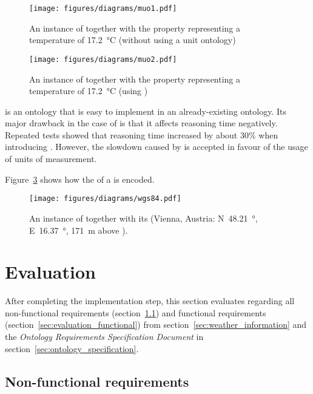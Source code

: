 \begin{figure}
  \centering
  \texttt{[image: figures/diagrams/muo1.pdf]}
  \caption{An instance of  together with the property  representing a temperature of \SI{17.2}{\celsius} (without using a unit ontology)}
  \label{fig:muo1}
\end{figure}

\begin{figure}
  \centering
  \texttt{[image: figures/diagrams/muo2.pdf]}
  \caption{An instance of  together with the property  representing a temperature of \SI{17.2}{\celsius} (using \muo)}
  \label{fig:muo2}
\end{figure}

\muo is an ontology that is easy to implement in an already-existing ontology. Its major drawback in the case of \thinkhomeweather is that it affects reasoning time negatively. Repeated tests showed that reasoning time increased by about $30 \%$ when introducing \muo. However, the slowdown caused by \muo is accepted in favour of the usage of units of measurement.

\vspace{1em}

Figure~\ref{fig:owl_wgs84} shows how the  of a  is encoded.

\begin{figure}
  \centering
  \texttt{[image: figures/diagrams/wgs84.pdf]}
  \caption{An instance of  together with its  (Vienna, Austria: N~\SI{48.21}{\degree}, E~\SI{16.37}{\degree}, \SI{171}{\metre} above ).}
  \label{fig:owl_wgs84}
\end{figure}

\section{Evaluation}
\label{sec:ontology_evaluation}

After completing the implementation step, this section evaluates \thinkhomeweather regarding all non-functional requirements (section~\ref{sec:evaluation_non_functional}) and functional requirements (section~\ref{sec:evaluation_functional}) from section~\ref{sec:weather_information} and the \emph{Ontology Requirements Specification Document} in section~\ref{sec:ontology_specification}.

\subsection{Non-functional requirements}
\label{sec:evaluation_non_functional}

